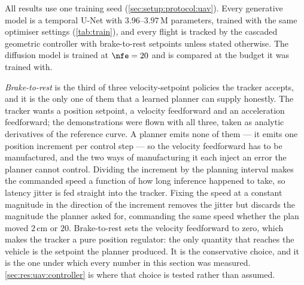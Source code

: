 
All results use one training seed (\autoref{sec:setup:protocol:uav}). Every generative model is a temporal U-Net with $3.96$--$3.97$\,M
parameters, trained with the same optimiser settings (\autoref{tab:train}), and every flight is tracked by
the cascaded geometric controller with brake-to-rest setpoints unless stated otherwise. The diffusion model
is trained at $\nfe=20$ and is compared at the budget it was trained with.

\emph{Brake-to-rest} is the third of three velocity-setpoint policies the tracker accepts, and it is the
only one of them that a learned planner can supply honestly. The tracker wants a position setpoint, a
velocity feedforward and an acceleration feedforward; the demonstrations were flown with all three, taken
as analytic derivatives of the reference curve. A planner emits none of them --- it emits one position
increment per control step --- so the velocity feedforward has to be manufactured, and the two ways of
manufacturing it each inject an error the planner cannot control. Dividing the increment by the planning
interval makes the commanded speed a function of how long inference happened to take, so latency jitter
is fed straight into the tracker. Fixing the speed at a constant magnitude in the direction of the
increment removes the jitter but discards the magnitude the planner asked for, commanding the same speed
whether the plan moved $2$\,cm or $20$. Brake-to-rest sets the velocity feedforward to zero, which makes
the tracker a pure position regulator: the only quantity that reaches the vehicle is the setpoint the
planner produced. It is the conservative choice, and it is the one under which every number in this
section was measured. \autoref{sec:res:uav:controller} is where that choice is tested rather than assumed.


